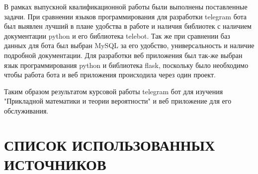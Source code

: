 \documentclass[12pt, oldlfont, amsfonts]{report}
\begin{document}
В рамках выпускной квалификационной работы были выполнены поставленные задачи. При сравнении языков программирования для разработки telegram бота был выявлен лучший в плане удобства в работе и наличия библиотек с наличием документации python и его библиотека telebot. Так же при сравнении баз данных для бота был выбран MySQL за его удобство, универсальность и наличие подробной документации. Для разработки веб приложения был так-же выбран язык программирования python и библиотека flask, поскольку было необходимо чтобы работа бота и веб приложения происходила через один проект.

Таким образом результатом курсовой работы telegram бот для изучения "Прикладной математики и теории вероятности" и веб приложение для его обслуживания.

\chapter*{\large{{СПИСОК ИСПОЛЬЗОВАННЫХ ИСТОЧНИКОВ}}}
\end{document}

